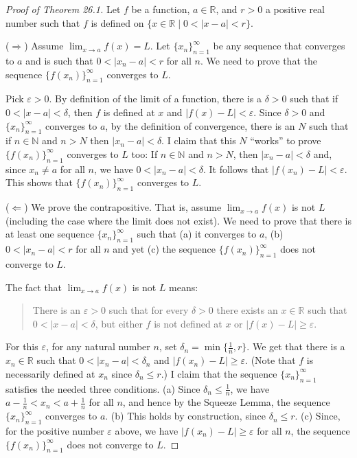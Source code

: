 \documentclass[12pt]{amsart}
\def\d{\delta}
\def\e{\varepsilon}
\newcommand{\R}{{\mathbb{R}}}
\newcommand{\N}{\mathbb{N}}
\numberwithin{equation}{section}
\theoremstyle{plain} %
\theoremstyle{definition}
\theoremstyle{remark}
\begin{document}
\begin{proof}[Proof of Theorem 26.1] Let $f$ be a function, $a \in \R$, and $r > 0$ a
  positive real number such that $f$ is    defined on $\{x \in \R \mid 0 < |x-a| < r \}$. 

  ($\Rightarrow$) Assume 
$\lim_{x \to a} f(x) = L$. Let 
$\{x_n\}_{n=1}^\infty$ be any sequence that converges to $a$ and is such that $0 < |x_n-a| < r$ for all $n$.
We need to prove that the sequence $\{f(x_n)\}_{n=1}^\infty$ converges to $L$. 

Pick $\e > 0$. By definition of the limit of a function, there is a $\d > 0$ such that if
$0 < |x-a| < \d$, then $f$ is defined at $x$ and ${|f(x) - L| < \e}$.
Since $\d > 0$ and $\{x_n\}_{n=1}^\infty$ converges to $a$, by the definition of convergence, there is an $N$ such that if
$n \in \N$ and $n > N$ then $|x_n - a| < \d$. 
I claim that this $N$ ``works'' to prove $\{f(x_n)\}_{n=1}^\infty$ converges to $L$ too:
If $n \in \N$ and $n > N$, then $|x_n - a| < \d$ and, since $x_n \ne a$ for all $n$, we have  
$0 < |x_n - a| < \d$. It follows that $|f(x_n) - L| < \e$. This shows that $\{f(x_n)\}_{n=1}^\infty$ converges to $L$. 


($\Leftarrow$) We prove the contrapositive. That is, assume 
$\lim_{x \to a} f(x)$ is not $L$ (including the case where the limit does not exist).  We need to prove that
there is at least one sequence 
$\{x_n\}_{n=1}^\infty$ such that (a) it converges to $a$, (b)  $0 < |x_n -a| < r$ for all $n$ and yet
(c) the sequence $\{f(x_n)\}_{n=1}^\infty$ does not converge to $L$. 

The fact that $\lim_{x \to a} f(x)$ is not $L$ means:
\begin{quote}
  There is an $\e > 0$ such that for every $\d > 0$ there exists an $x \in \R$ such that
$0 < |x- a| < \d$, but   either $f$ is not  defined at $x$  or $|f(x) -L| \geq \e$.
\end{quote}
For this $\e$, for any natural number $n$, set $\d_n = \min\{\frac{1}{n}, r\}$. We get that there is a $x_n \in \R$ such
that $0 < |x_n-a| < \d_n$ and $|f(x_n) - L| \geq \e$. (Note that $f$ is necessarily defined at $x_n$ since $\d_n \leq r$.)
I claim that the sequence $\{x_n\}_{n=1}^\infty$ satisfies the needed three conditions. 
(a) Since $\delta_n \leq \frac{1}{n}$, we have $a - \frac{1}{n} < x_n < a + \frac{1}{n}$ for all $n$, and hence by the Squeeze Lemma,
the sequence $\{x_n\}_{n=1}^\infty$ converges to $a$. (b) This holds by construction, since $\d_n \leq r$. 
(c) Since, for the positive number $\e$ above, we have $|f(x_n) -L| \geq \e$ for all $n$, the sequence $\{f(x_n)\}_{n=1}^\infty$ does not converge to $L$. 
\end{proof}
\end{document}
